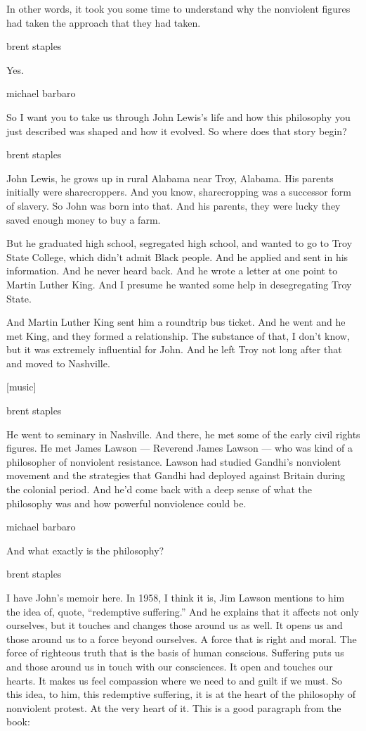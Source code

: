 In other words, it took you some time to understand why the nonviolent
figures had taken the approach that they had taken.

brent staples

Yes.

michael barbaro

So I want you to take us through John Lewis's life and how this
philosophy you just described was shaped and how it evolved. So where
does that story begin?

brent staples

John Lewis, he grows up in rural Alabama near Troy, Alabama. His parents
initially were sharecroppers. And you know, sharecropping was a
successor form of slavery. So John was born into that. And his parents,
they were lucky they saved enough money to buy a farm.

But he graduated high school, segregated high school, and wanted to go
to Troy State College, which didn't admit Black people. And he applied
and sent in his information. And he never heard back. And he wrote a
letter at one point to Martin Luther King. And I presume he wanted some
help in desegregating Troy State.

And Martin Luther King sent him a roundtrip bus ticket. And he went and
he met King, and they formed a relationship. The substance of that, I
don't know, but it was extremely influential for John. And he left Troy
not long after that and moved to Nashville.

{[}music{]}

brent staples

He went to seminary in Nashville. And there, he met some of the early
civil rights figures. He met James Lawson --- Reverend James Lawson ---
who was kind of a philosopher of nonviolent resistance. Lawson had
studied Gandhi's nonviolent movement and the strategies that Gandhi had
deployed against Britain during the colonial period. And he'd come back
with a deep sense of what the philosophy was and how powerful
nonviolence could be.

michael barbaro

And what exactly is the philosophy?

brent staples

I have John's memoir here. In 1958, I think it is, Jim Lawson mentions
to him the idea of, quote, ``redemptive suffering.'' And he explains
that it affects not only ourselves, but it touches and changes those
around us as well. It opens us and those around us to a force beyond
ourselves. A force that is right and moral. The force of righteous truth
that is the basis of human conscious. Suffering puts us and those around
us in touch with our consciences. It open and touches our hearts. It
makes us feel compassion where we need to and guilt if we must. So this
idea, to him, this redemptive suffering, it is at the heart of the
philosophy of nonviolent protest. At the very heart of it. This is a
good paragraph from the book:

